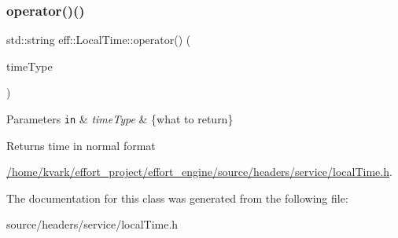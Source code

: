 \subsubsection{\texorpdfstring{operator()()}{operator()()}}
{\footnotesize\ttfamily std\+::string eff\+::\+Local\+Time\+::operator() (\begin{DoxyParamCaption}\item[{Local\+Time\+::\+Time\+Type}]{time\+Type }\end{DoxyParamCaption})}


\begin{DoxyParams}[1]{Parameters}
\mbox{\tt in}  & {\em time\+Type} & \{what to return\} \\
\hline
\end{DoxyParams}
\begin{DoxyReturn}{Returns}
time in normal format 
\end{DoxyReturn}
\begin{Desc}
\item[Examples\+: ]\par
\mbox{\hyperlink{_2home_2kvark_2effort_project_2effort_engine_2source_2headers_2service_2localTime_8h-example}{/home/kvark/effort\+\_\+project/effort\+\_\+engine/source/headers/service/local\+Time.\+h}}.\end{Desc}


The documentation for this class was generated from the following file\+:\begin{DoxyCompactItemize}
\item 
source/headers/service/local\+Time.\+h\end{DoxyCompactItemize}
